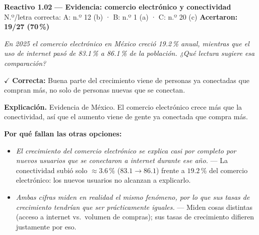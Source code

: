 \documentclass[10pt,letterpaper]{article}
\begin{document}
\begin{minipage}{\textwidth}
{\color{guinda}\textbf{Reactivo 1.02}} \textbf{— Evidencia: comercio electrónico y conectividad}\\[-1pt]
{\scriptsize N.º/letra correcta: A: n.º 12 (b) · B: n.º 1 (a) · C: n.º 20 (c) \hfill \textbf{Acertaron: 19/27 (70\,\%)}}

\textit{En 2025 el comercio electrónico en México creció 19.2\,\% anual, mientras que el uso de internet pasó de 83.1\,\% a 86.1\,\% de la población. ¿Qué lectura sugiere esa comparación?}

\textcolor{verde}{$\checkmark$} \textbf{Correcta:} Buena parte del crecimiento viene de personas ya conectadas que compran más, no solo de personas nuevas que se conectan.

\textbf{Explicación.} Evidencia de México. El comercio electrónico crece más que la conectividad, así que el aumento viene de gente ya conectada que compra más.

\textbf{Por qué fallan las otras opciones:}
\begin{itemize}[itemsep=0pt,topsep=1pt,leftmargin=1.3em,parsep=0pt]
\item[\textcolor{rojo}{$\times$}] \textit{El crecimiento del comercio electrónico se explica casi por completo por nuevos usuarios que se conectaron a internet durante ese año.} --- La conectividad subió solo $\approx3.6$\,\% ($83.1\to86.1$) frente a $19.2$\,\% del comercio electrónico: los nuevos usuarios no alcanzan a explicarlo.
\item[\textcolor{rojo}{$\times$}] \textit{Ambas cifras miden en realidad el mismo fenómeno, por lo que sus tasas de crecimiento tendrían que ser prácticamente iguales.} --- Miden cosas distintas (acceso a internet vs.\ volumen de compras); sus tasas de crecimiento difieren justamente por eso.
\end{itemize}
\end{minipage}\par\vspace{5pt}{\color{gray!40}\hrule}\vspace{5pt}
\end{document}
